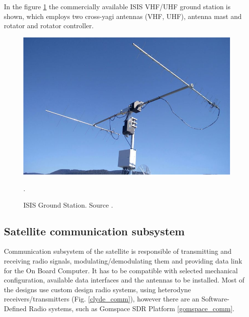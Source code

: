 In the figure \ref{isis_gs} the commercially available ISIS VHF/UHF ground station is shown, which employs two cross-yagi antennas (VHF, UHF), antenna mast and rotator and rotator controller.

\begin{figure}[H]
    \centering
    \includegraphics[width=0.5\paperwidth]{img/2/isis_gs.jpg}
    \caption{ISIS Ground Station. Source \cite{isis_gs}.}.
    \label{isis_gs}
\end{figure}

\subsection{Satellite communication subsystem}
Communication subsystem of the satellite is responsible of transmitting and receiving radio signals, modulating/demodulating them and providing data link for the On Board Computer. It has to be compatible with selected mechanical configuration, available data interfaces and the antennas to be installed. Most of the designs use custom design radio systems, using heterodyne receivers/transmitters (Fig. \ref{clyde_comm}), however there are an Software-Defined Radio systems, such as Gomspace SDR Platform \ref{gomspace_comm}.

